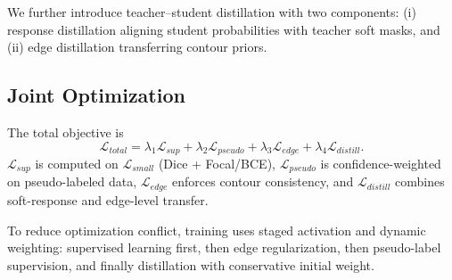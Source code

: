 ﻿\documentclass[11pt]{article}
\begin{document}
We further introduce teacher--student distillation with two components: (i) response distillation aligning student probabilities with teacher soft masks, and (ii) edge distillation transferring contour priors.

\subsection{Joint Optimization}
The total objective is
\begin{equation}
\mathcal{L}_{total} = \lambda_1 \mathcal{L}_{sup} + \lambda_2 \mathcal{L}_{pseudo} + \lambda_3 \mathcal{L}_{edge} + \lambda_4 \mathcal{L}_{distill}.
\end{equation}
$\mathcal{L}_{sup}$ is computed on $\mathcal{L}_{small}$ (Dice + Focal/BCE), $\mathcal{L}_{pseudo}$ is confidence-weighted on pseudo-labeled data, $\mathcal{L}_{edge}$ enforces contour consistency, and $\mathcal{L}_{distill}$ combines soft-response and edge-level transfer.

To reduce optimization conflict, training uses staged activation and dynamic weighting: supervised learning first, then edge regularization, then pseudo-label supervision, and finally distillation with conservative initial weight.
\end{document}
